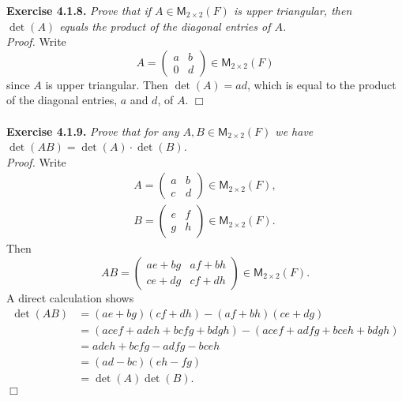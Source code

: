 \documentclass{article}
\begin{document}



\textbf{Exercise 4.1.8.}
\emph{Prove that if $A \in \mathsf{M}_{2 \times 2}(F)$ is upper triangular,
then $\det(A)$ equals the product of the diagonal entries of $A$.} \\

\emph{Proof.}
Write
$$A =
\begin{pmatrix}
a & b \\
0 & d
\end{pmatrix} \in \mathsf{M}_{2 \times 2}(F)$$
since $A$ is upper triangular.
Then $\det(A) = ad$, which is equal to the product of the diagonal entries,
$a$ and $d$, of $A$.
$\Box$ \\\\






\textbf{Exercise 4.1.9.}
\emph{Prove that for any $A, B \in \mathsf{M}_{2 \times 2}(F)$
we have $\det(AB) = \det(A) \cdot \det(B)$.} \\

\emph{Proof.}
Write
\begin{align*}
  A =
  \begin{pmatrix}
  a & b \\
  c & d
  \end{pmatrix} \in \mathsf{M}_{2 \times 2}(F), \\
  B =
  \begin{pmatrix}
  e & f \\
  g & h
  \end{pmatrix} \in \mathsf{M}_{2 \times 2}(F).
\end{align*}
Then
$$AB =
\begin{pmatrix}
ae + bg & af + bh \\
ce + dg & cf + dh
\end{pmatrix} \in \mathsf{M}_{2 \times 2}(F).$$
A direct calculation shows
\begin{align*}
\det(AB)
&= (ae + bg)(cf + dh) - (af + bh)(ce + dg) \\
&= (acef + adeh + bcfg + bdgh) - (acef + adfg + bceh + bdgh) \\
&= adeh + bcfg - adfg - bceh \\
&= (ad - bc)(eh - fg) \\
&= \det(A)\det(B).
\end{align*}
$\Box$ \\\\
\end{document}
